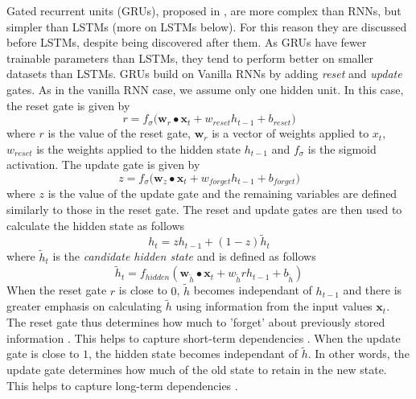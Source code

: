 \documentclass[]{article}
\begin{document}
Gated recurrent units (GRUs), proposed in \cite{DBLP:journals/corr/ChoMGBSB14}, are more complex than RNNs, but simpler than LSTMs (more on LSTMs below). For this reason they are discussed before LSTMs, despite being discovered after them. As GRUs have fewer trainable parameters than LSTMs, they tend to perform better on smaller datasets than LSTMs.
\newline
\newline
GRUs build on Vanilla RNNs by adding \textit{reset} and \textit{update} gates. As in the vanilla RNN case, we assume only one hidden unit. In this case, the reset gate is given by
\begin{equation}
r = f_{\sigma} \bigg( \textbf{w}_{r} \bullet \textbf{x}_{t}  + w_{reset} h_{t-1} + b_{reset}\bigg)
\end{equation}
where $r$ is the value of the reset gate, $\textbf{w}_{r}$ is a vector of weights applied to $x_{t}$, $w_{reset}$ is the weights applied to the hidden state $h_{t-1}$ and $f_{\sigma}$ is the sigmoid activation. The update gate is given by
\begin{equation}
z = f_{\sigma} \bigg( \textbf{w}_{z} \bullet \textbf{x}_{t}  + w_{forget} h_{t-1} + b_{forget}\bigg)
\end{equation}
where $z$ is the value of the update gate and the remaining variables are defined similarly to those in the reset gate.
\newline
\newline
The reset and update gates are then used to calculate the hidden state as follows
\begin{equation}
h_{t} = zh_{t-1} + (1-z) \tilde{h}_{t}
\end{equation}
where $\tilde{h}_{t}$ is the \textit{candidate hidden state} and is defined as follows
\begin{equation}
\tilde{h}_{t} = f_{hidden}(\textbf{w}_{\tilde{h}} \bullet \textbf{x}_{t} + w_{\tilde{h}} r h_{t-1} + b_{\tilde{h}})
\end{equation}
When the reset gate $r$ is close to $0$, $\tilde{h}$ becomes independant of $h_{t-1}$ and there is greater emphasis on calculating $\tilde{h}$ using information from the input values $\textbf{x}_{t}$. The reset gate thus determines how much to 'forget' about previously stored information \cite{DBLP:journals/corr/ChoMGBSB14}. This helps to capture short-term dependencies \cite{zhang-lipton-li-smola}.
\newline
\newline
When the update gate is close to $1$, the hidden state becomes independant of $\tilde{h}$. In other words, the update gate determines how much of the old state to retain in the new state. This helps to capture long-term dependencies \cite{zhang-lipton-li-smola}.
\end{document}
